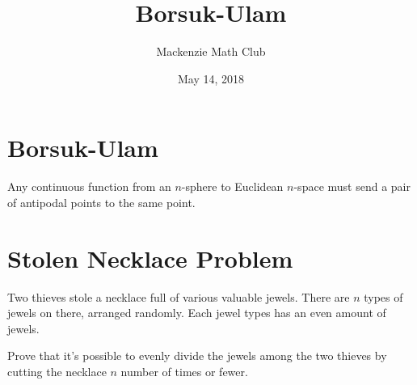 

\title{Borsuk-Ulam}
\author{Mackenzie Math Club}
\date{May 14, 2018}



	\section*{Borsuk-Ulam}
		Any continuous function from an $n$-sphere to Euclidean $n$-space must send a pair of antipodal points to the same point.
	\section*{Stolen Necklace Problem}
		Two thieves stole a necklace full of various valuable jewels.
		There are $n$ types of jewels on there, arranged randomly.
		Each jewel types has an even amount of jewels.
		
		Prove that it's possible to evenly divide the jewels among the two thieves by cutting the necklace $n$ number of times or fewer.

